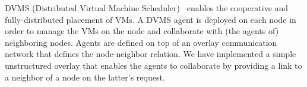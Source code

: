 DVMS (Distributed Virtual Machine Scheduler)~\cite{quesnel:cpe2012} enables the
cooperative and fully-distributed placement of
VMs.
%
%
%
%
%
A DVMS agent is deployed on each node in order to manage the VMs on
the node and collaborate with (the agents of) neighboring nodes.
Agents are defined on top of an overlay communication network that
defines the node-neighbor relation.
We have implemented a simple %
unstructured overlay that enables the agents to collaborate
by providing a link to a neighbor of a node on the latter's request.


%

